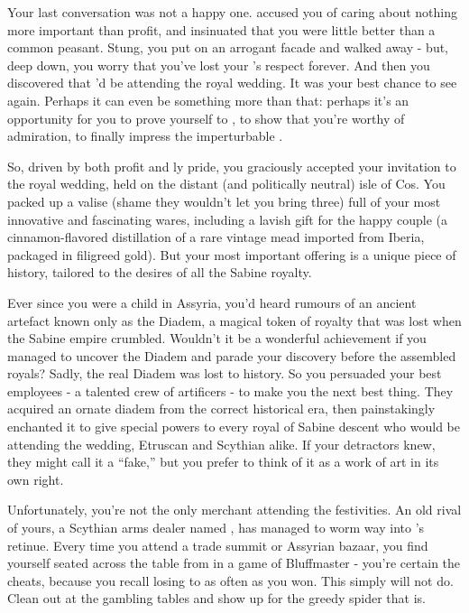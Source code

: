 \documentclass[char]{Kos}
\begin{document}
Your last conversation was not a happy one. \cAnarchist{\They} accused you of caring about nothing more important than profit, and insinuated that you were little better than a common peasant. Stung, you put on an arrogant facade and walked away - but, deep down, you worry that you've lost your \cAnarchist{\sibling}'s respect forever. And then you discovered that \cAnarchist{\they}'d be attending the royal wedding. It was your best chance to see \cAnarchist{\them} again. Perhaps it can even be something more than that: perhaps it's an opportunity for you to prove yourself to \cAnarchist{\them}, to show \cAnarchist{\them} that you're worthy of \cAnarchist{\their} admiration, to finally impress the imperturbable \cAnarchist{}.

So, driven by both profit and \cMerchant{\sibling}ly pride, you graciously accepted your invitation to the royal wedding, held on the distant (and politically neutral) isle of Cos. You packed up a valise (shame they wouldn't let you bring three) full of your most innovative and fascinating wares, including a lavish gift for the happy couple (a cinnamon-flavored distillation of a rare vintage mead imported from Iberia, packaged in filigreed gold). But your most important offering is a unique piece of history, tailored to the desires of all the Sabine royalty. 

Ever since you were a child in Assyria, you'd heard rumours of an ancient artefact known only as the Diadem, a magical token of royalty that was lost when the Sabine empire crumbled. Wouldn't it be a wonderful achievement if you managed to uncover the Diadem and parade your discovery before the assembled royals? Sadly, the real Diadem was lost to history. So you persuaded your best employees - a talented crew of artificers - to make you the next best thing. They acquired an ornate diadem from the correct historical era, then painstakingly enchanted it to give special powers to every royal of Sabine descent who would be attending the wedding, Etruscan and Scythian alike. If your detractors knew, they might call it a ``fake,'' but you prefer to think of it as a work of art in its own right.

Unfortunately, you're not the only merchant attending the festivities. An old rival of yours, a Scythian arms dealer named \cArmsDealer{}, has managed to worm \cArmsDealer{\their} way into \cScythiaKing{\Monarch} \cScythiaKing{}'s retinue. Every time you attend a trade summit or Assyrian bazaar, you find yourself seated across the table from \cArmsDealer{\them} in a game of Bluffmaster - you're certain the \cArmsDealer{\human} cheats, because you recall losing to \cArmsDealer{\them} as often as you won. This simply will not do. Clean \cArmsDealer{} out at the gambling tables and show \cArmsDealer{\them} up for the greedy spider that \cArmsDealer{\they} is. 
\end{document}
